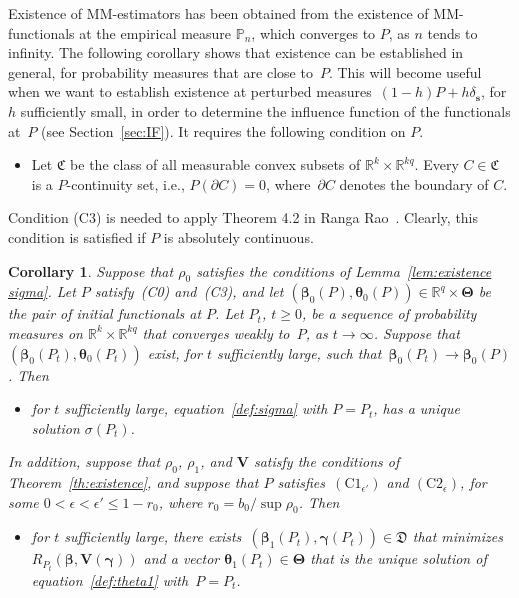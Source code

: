 \documentclass{article}
\numberwithin{equation}{section}
\theoremstyle{plain}
\newtheorem{corollary}{Corollary}
\newcommand{\R}{\mathbb{R}}
\newcommand{\bbeta}{\bm\beta}
\newcommand{\btheta}{\bm\theta}
\newcommand{\bgamma}{\bm\gamma}
\newcommand{\bTheta}{\bm\Theta}
\newcommand{\bs}{\mathbf{s}}
\newcommand{\bV}{\mathbf{V}}
\begin{document}
Existence of MM-estimators has been obtained from the existence of MM-functionals at the empirical measure $\mathbb{P}_n$,
which converges to $P$, as $n$ tends to infinity.
The following corollary shows that existence can be established in general,
for probability measures that are close to~$P$.
This will become useful when we want to establish existence at 
perturbed measures~$(1-h)P+h\delta_{\bs}$, for $h$ sufficiently small, in order to determine the influence function of the functionals at~$P$
(see Section~\ref{sec:IF}).
It requires the following condition on $P$.
\begin{itemize}
\item[(C3)]
Let $\mathfrak{C}$ be the class of all measurable convex subsets of $\R^k\times \R^{kq}$.
Every $C\in \mathfrak{C}$ is a $P$-continuity set, i.e., $P(\partial C)=0$,
where~$\partial C$ denotes the boundary of $C$.
\end{itemize}
Condition (C3) is needed to apply Theorem 4.2 in Ranga Rao~\cite{rangarao1962}.
Clearly, this condition is satisfied if $P$ is absolutely continuous.
\begin{corollary}
\label{cor:existence weak convergence}
Suppose that $\rho_0$ satisfies the conditions of Lemma~\ref{lem:existence sigma}.
Let $P$ satisfy~(C0) and~(C3), and let $(\bbeta_0(P),\btheta_0(P))\in\R^{q}\times\bTheta$ 
be the pair of initial functionals at $P$.
Let $P_t$, $t\geq0$, be a sequence of probability measures on $\R^k\times \R^{kq}$ that converges weakly to~$P$, as $t\to\infty$.
Suppose that $(\bbeta_0(P_t),\btheta_0(P_t))$ exist, for $t$ sufficiently large, 
such that~$\bbeta_0(P_t)\to\bbeta_0(P)$.
Then
\begin{itemize}
\item[(i)]
for $t$ sufficiently large,
equation~\eqref{def:sigma} with $P=P_t$, has a unique solution $\sigma(P_t)$.
\end{itemize}
In addition, suppose that $\rho_0$, $\rho_1$, and $\bV$ satisfy the conditions of Theorem~\ref{th:existence},
and suppose that $P$ satisfies~$(\text{C1}_{\epsilon'})$ and $(\text{C2}_\epsilon)$,
for some $0<\epsilon<\epsilon'\leq 1-r_0$, where $r_0=b_0/\sup\rho_0$.
Then
\begin{itemize}
\item[(ii)]
for $t$ sufficiently large,
there exists~$(\bbeta_1(P_t),\bgamma(P_t))\in \mathfrak{D}$ that minimizes~$R_{P_t}(\bbeta,\bV(\bgamma))$
and a vector $\btheta_1(P_t)\in\bTheta$ that is the unique solution of equation~\eqref{def:theta1} with~$P=P_t$.
\end{itemize}
\end{corollary}
\end{document}

